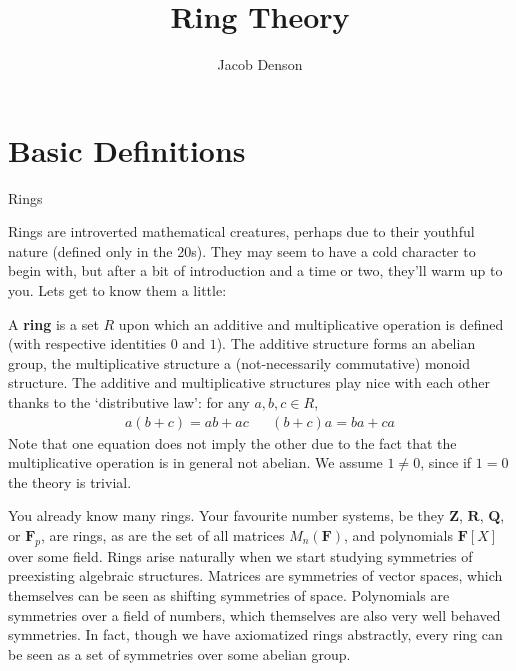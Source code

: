 

\title{Ring Theory}
\author{Jacob Denson}



\maketitle
\tableofcontents

\chapter{Basic Definitions}


Rings 

Rings are introverted mathematical creatures, perhaps due to their youthful nature (defined only in the 20s). They may seem to have a cold character to begin with, but after a bit of introduction and a time or two, they'll warm up to you. Lets get to know them a little:

\begin{definition}
    A {\bf ring} is a set $R$ upon which an additive and multiplicative operation is defined (with respective identities $0$ and $1$). The additive structure forms an abelian group, the multiplicative structure a (not-necessarily commutative) monoid structure. The additive and multiplicative structures play nice with each other thanks to the `distributive law': for any $a, b, c \in R$,
    \begin{align*}
        a(b + c) = ab + ac && (b + c)a = ba + ca
    \end{align*}
    Note that one equation does not imply the other due to the fact that the multiplicative operation is in general not abelian. We assume $1 \neq 0$, since if $1 = 0$ the theory is trivial.
\end{definition}

You already know many rings. Your favourite number systems, be they $\mathbf{Z}$, $\mathbf{R}$, $\mathbf{Q}$, or $\mathbf{F}_p$, are rings, as are the set of all matrices $M_n(\mathbf{F})$, and polynomials $\mathbf{F}[X]$ over some field. Rings arise naturally when we start studying symmetries of preexisting algebraic structures. Matrices are symmetries of vector spaces, which themselves can be seen as shifting symmetries of space. Polynomials are symmetries over a field of numbers, which themselves are also very well behaved symmetries. In fact, though we have axiomatized rings abstractly, every ring can be seen as a set of symmetries over some abelian group.

